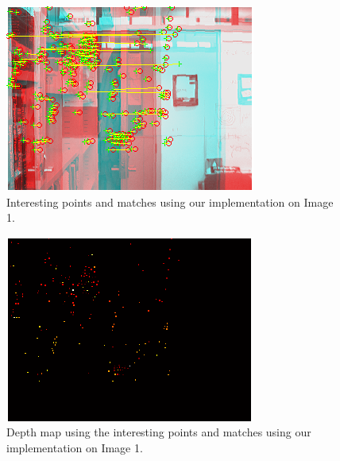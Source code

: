 \begin{figure}[H]\centering
	\includegraphics[width=0.8\linewidth]{Images/01_our_match.png}
	\caption{Interesting points and matches using our implementation on Image 1.}
	\label{fig:jp-ofc-ours-match}
\end{figure}

\begin{figure}[H]\centering
	\includegraphics[width=0.8\linewidth]{Images/01_our_depth.png}
	\caption{Depth map using the interesting points and matches using our implementation on Image 1.}
	\label{fig:jp-ofc-ours-depth}
\end{figure}


